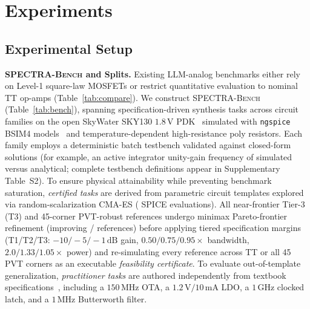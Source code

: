 \section{Experiments}
\label{sec:exp}

\subsection{Experimental Setup}
\label{sec:setup}


\textbf{\textsc{SPECTRA-Bench} and Splits.} Existing LLM-analog benchmarks either rely on Level-1 square-law MOSFETs or restrict quantitative evaluation to nominal TT op-amps (Table~\ref{tab:compare}). We construct \textsc{SPECTRA-Bench} (Table~\ref{tab:bench}), spanning \NTasksTotal{} specification-driven synthesis tasks across \NPrimaryFamilies{} circuit families on the open SkyWater SKY130 $1.8\,\mathrm{V}$ PDK~\cite{sky130pdk} simulated with \texttt{ngspice} BSIM4 models~\cite{ngspice42} and temperature-dependent high-resistance poly resistors. Each family employs a deterministic batch testbench validated against closed-form solutions (for example, an active integrator unity-gain frequency of \TBIntegSim{} simulated versus \TBIntegIdeal{} analytical; complete testbench definitions appear in Supplementary Table~S2). To ensure physical attainability while preventing benchmark saturation, \NCertified{} \emph{certified tasks} are derived from \NTemplates{} parametric circuit templates explored via random-scalarization CMA-ES (\NExploreEvals{} SPICE evaluations). All \NHard{} near-frontier Tier-3 (T3) and 45-corner PVT-robust references undergo minimax Pareto-frontier refinement (improving \NFrontier{}/\NHard{} references) before applying tiered specification margins (T1/T2/T3: $-10/-5/-1\,\mathrm{dB}$ gain, $0.50/0.75/0.95\times$ bandwidth, $2.0/1.33/1.05\times$ power) and re-simulating every reference across TT or all 45 PVT corners as an executable \emph{feasibility certificate}. To evaluate out-of-template generalization, \NDesigner{} \emph{practitioner tasks} are authored independently from textbook specifications~\cite{allen2012cmos,razavi2017design}, including a $150\,\mathrm{MHz}$ OTA, a $1.2\,\mathrm{V}/10\,\mathrm{mA}$ LDO, a $1\,\mathrm{GHz}$ clocked latch, and a $1\,\mathrm{MHz}$ Butterworth filter.

